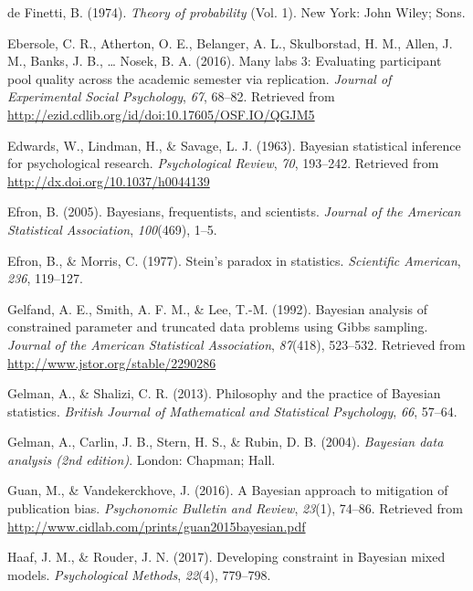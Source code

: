 \documentclass[english,man]{apa6}
\theoremstyle{definition}
\theoremstyle{definition}
\theoremstyle{definition}
\theoremstyle{remark}
\begin{document}
\hypertarget{ref-deFinetti:1974}{}
de Finetti, B. (1974). \emph{Theory of probability} (Vol. 1). New York:
John Wiley; Sons.

\hypertarget{ref-Ebersole:etal:2016}{}
Ebersole, C. R., Atherton, O. E., Belanger, A. L., Skulborstad, H. M.,
Allen, J. M., Banks, J. B., \ldots{} Nosek, B. A. (2016). Many labs 3:
Evaluating participant pool quality across the academic semester via
replication. \emph{Journal of Experimental Social Psychology},
\emph{67}, 68--82. Retrieved from
\url{http://ezid.cdlib.org/id/doi:10.17605/OSF.IO/QGJM5}

\hypertarget{ref-Edwards:etal:1963}{}
Edwards, W., Lindman, H., \& Savage, L. J. (1963). Bayesian statistical
inference for psychological research. \emph{Psychological Review},
\emph{70}, 193--242. Retrieved from
\url{http://dx.doi.org/10.1037/h0044139}

\hypertarget{ref-Efron:2005}{}
Efron, B. (2005). Bayesians, frequentists, and scientists. \emph{Journal
of the American Statistical Association}, \emph{100}(469), 1--5.

\hypertarget{ref-Efron:Morris:1977}{}
Efron, B., \& Morris, C. (1977). Stein's paradox in statistics.
\emph{Scientific American}, \emph{236}, 119--127.

\hypertarget{ref-Gelfand:etal:1992}{}
Gelfand, A. E., Smith, A. F. M., \& Lee, T.-M. (1992). Bayesian analysis
of constrained parameter and truncated data problems using Gibbs
sampling. \emph{Journal of the American Statistical Association},
\emph{87}(418), 523--532. Retrieved from
\url{http://www.jstor.org/stable/2290286}

\hypertarget{ref-Gelman:Shalizi:2013}{}
Gelman, A., \& Shalizi, C. R. (2013). Philosophy and the practice of
Bayesian statistics. \emph{British Journal of Mathematical and
Statistical Psychology}, \emph{66}, 57--64.

\hypertarget{ref-Gelman:etal:2004}{}
Gelman, A., Carlin, J. B., Stern, H. S., \& Rubin, D. B. (2004).
\emph{Bayesian data analysis (2nd edition)}. London: Chapman; Hall.

\hypertarget{ref-Guan:Vandekerckhove:2016}{}
Guan, M., \& Vandekerckhove, J. (2016). A Bayesian approach to
mitigation of publication bias. \emph{Psychonomic Bulletin and Review},
\emph{23}(1), 74--86. Retrieved from
\url{http://www.cidlab.com/prints/guan2015bayesian.pdf}

\hypertarget{ref-Haaf:Rouder:2017}{}
Haaf, J. M., \& Rouder, J. N. (2017). Developing constraint in Bayesian
mixed models. \emph{Psychological Methods}, \emph{22}(4), 779--798.
\end{document}
